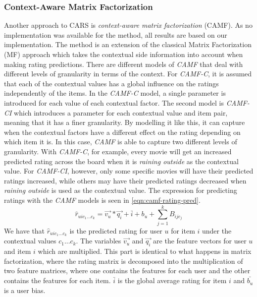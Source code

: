 \subsubsection{Context-Aware Matrix Factorization}\label{subsec:camf}
Another approach to CARS is \textit{context-aware matrix factorization} (CAMF)\cite{baltrunasCAMF}.
As no implementation was available for the method, all results are based on our implementation.
The method is an extension of the classical Matrix Factorization (MF) approach which takes the contextual side information into account when making rating predictions.
There are different models of \textit{CAMF} that deal with different levels of granularity in terms of the context.
For \textit{CAMF-C}, it is assumed that each of the contextual values has a global influence on the ratings independently of the items.
In the \textit{CAMF-C} model, a single parameter is introduced for each value of each contextual factor.
The second model is \textit{CAMF-CI} which introduces a parameter for each contextual value and item pair, meaning that it has a finer granularity.
By modelling it like this, it can capture when the contextual factors have a different effect on the rating depending on which item it is.
In this case, \textit{CAMF} is able to capture two different levels of granularity.
With \textit{CAMF-C}, for example, every movie will get an increased predicted rating across the board when it is \textit{raining outside} as the contextual value.
For \textit{CAMF-CI}, however, only some specific movies will have their predicted ratings increased, while others may have their predicted ratings decreased when \textit{raining outside} is used as the contextual value.
The expression for predicting ratings with the \textit{CAMF} models is seen in \autoref{eqn:camf-rating-pred}.
\begin{equation}
    \label{eqn:camf-rating-pred}
    \hat{r}_{uic_1...c_k} = \vec{v_u} * \vec{q_i} + \bar{i} + b_u + \sum\limits_{j = 1}^k B_{ijc_j}
\end{equation}
We have that $\hat{r}_{uic_1...c_k}$ is the predicted rating for user $u$ for item $i$ under the contextual values $c_1...c_k$.
The variables $\vec{v_u} $ and $ \vec{q_i}$ are the feature vectors for user $u$ and item $i$ which are multiplied.
This part is identical to what happens in matrix factorization, where the rating matrix is decomposed into the multiplication of two feature matrices, where one contains the features for each user and the other contains the features for each item.
$\bar{i}$ is the global average rating for item $i$ and $\bar{b_u}$ is a user bias. 
